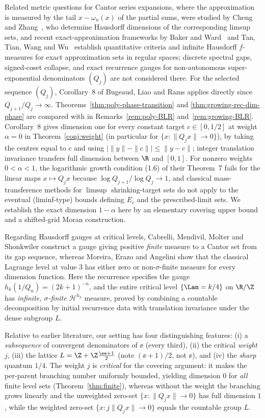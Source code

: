 Related metric questions for Cantor series expansions, where the approximation
is measured by the tail $x-\omega_n(x)$ of the partial sums, were studied by
Cheng and Zhang~\cite{CZ}, who determine Hausdorff dimensions of the
corresponding limsup sets, and recent exact-approximation frameworks by Baker
and Ward~\cite{BW2025} and Tan, Tian, Wang and Wu~\cite{TTWW2026} establish
quantitative criteria and infinite Hausdorff $f$-measures for exact
approximation sets in regular spaces; discrete spectral gaps, signed-coset
collapse, and exact recurrence gauges for non-autonomous super-exponential
denominators $(Q_j)$ are not considered there.
For the selected sequence $(Q_j)$, Corollary~8 of Bugeaud, Liao and Rams
\cite{BLR} applies directly since $Q_{j+1}/Q_j\to\infty$. Theorems~\ref{thm:poly-phase-transition} and
\ref{thm:growing-rec-dim-phase} are compared with \cite{BLR} in
Remarks~\ref{rem:poly-BLR} and~\ref{rem:growing-BLR}. Corollary~8 gives dimension
one for every constant target $c\in[0,1/2]$ at weight $\alpha=0$ in
Theorem~\ref{conj:weight} (in particular for $\{x:\|Q_jx\|\to0\}$), by taking
the centres equal to $c$ and using $|\|y\|-\|c\||\le\|y-c\|$; integer
translation invariance transfers full dimension between $\R$ and $[0,1]$. For
nonzero weights $0<\alpha<1$, the logarithmic growth condition (1.6) of their
Theorem~7 fails for the linear maps $x\mapsto Q_jx$ because
$\log Q_{j+1}/\log Q_j\to1$, and classical mass-transference methods for
$\limsup$ shrinking-target sets \cite{BV} do not apply to the eventual
(liminf-type) bounds defining $E_c$ and the prescribed-limit sets. We establish
the exact dimension $1-\alpha$ here by an elementary covering upper bound and a
shifted-grid Moran construction.

Regarding Hausdorff gauges at critical levels, Cabrelli, Mendivil, Molter and
Shonkwiler \cite[\S5, Theorem~3]{CMMS} construct a gauge giving positive
\emph{finite} measure to a Cantor set from its gap sequence, whereas Moreira,
Erazo and Angelini \cite{MEA} show that the classical Lagrange level at value
$3$ has either zero or non-$\sigma$-finite measure for every dimension function.
Here the recurrence specifies the gauge $h_k(1/Q_n)=(2k+1)^{-n}$, and the entire
critical level $\{\Lam=k/4\}$ on $\R/\Z$ has \emph{infinite, $\sigma$-finite}
$\mathcal H^{h_k}$ measure, proved by combining a countable decomposition by
initial recurrence data with translation invariance under the dense subgroup
$L$.

Relative to earlier literature, our setting has four distinguishing features:
(i) a \emph{subsequence} of convergent denominators of $\ee$ (every third),
(ii) the critical \emph{weight} $j$, (iii) the lattice
$L=\Z+\Z\frac{\ee+1}{2}$ (note $(\ee+1)/2$, not $\ee$), and (iv) the
\emph{sharp} quantum $1/4$. The weight $j$ is \emph{critical} for the covering
argument: it makes the per-parent branching number uniformly bounded, yielding
dimension $0$ for \emph{all} finite level sets (Theorem~\ref{thm:finite}),
whereas without the weight the branching grows linearly and the unweighted
zero-set $\{x:\|Q_jx\|\to0\}$ has full dimension $1$, while the weighted
zero-set $\{x:j\|Q_jx\|\to0\}$ equals the countable group $L$.

